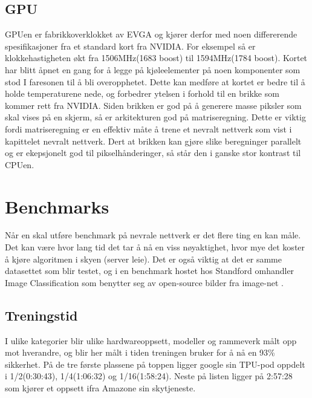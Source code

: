 \subsection{GPU}
GPUen er fabrikkoverklokket av EVGA og kjører derfor med noen differerende spesifikasjoner fra et standard kort fra NVIDIA. For eksempel så er klokkehastigheten økt fra 1506MHz(1683 boost) til 1594MHz(1784 boost). Kortet har blitt åpnet en gang for å legge på kjøleelementer på noen komponenter som stod I faresonen til å bli overopphetet. Dette kan medføre at kortet er bedre til å holde temperaturene nede, og forbedrer ytelsen i forhold til en brikke som kommer rett fra NVIDIA.\newline
Siden brikken er god på å generere masse piksler som skal vises på en skjerm, så er arkitekturen god på matriseregning. Dette er viktig fordi matriseregning er en effektiv måte å trene et nevralt nettverk som vist i kapittelet nevralt nettverk. Dert at brikken kan gjøre slike beregninger parallelt og er ekepsjonelt god til pikselhånderinger, så står den i ganske stor kontrast til CPUen.

\newpage
\section{Benchmarks}

Når en skal utføre benchmark på nevrale nettverk er det flere ting en kan måle. Det kan være hvor lang tid det tar å nå en viss nøyaktighet, hvor mye det koster å kjøre algoritmen i skyen (server leie). Det er også viktig at det er samme datasettet som blir testet, og i en benchmark\cite{benchmark} hostet hos Standford omhandler Image Classification som benytter seg av open-source bilder fra image-net \cite{image-net}.

\subsection{Treningstid}
I ulike kategorier blir ulike hardwareoppsett, modeller og rammeverk målt opp mot hverandre, og blir her målt i tiden treningen bruker for å nå en 93\% sikkerhet. På de tre første plassene på toppen ligger google sin TPU-pod oppdelt i 1/2(0:30:43), 1/4(1:06:32) og 1/16(1:58:24). Neste på listen ligger på 2:57:28 som kjører et oppsett ifra Amazone sin skytjeneste. 

